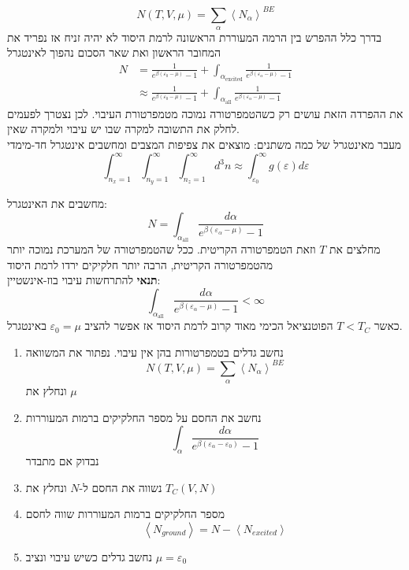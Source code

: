 \begin{cheatformula}
$$N \left( T,V,\mu \right)= \sum_\alpha \left< N_\alpha \right>^{BE}$$
בדרך כלל ההפרש בין הרמה המעוררת הראשונה לרמת היסוד לא יהיה זניח אז נפריד את המחובר הראשון ואת שאר הסכום נהפוך לאינטגרל
\begin{align*}
N &= \frac{1}{e^{\beta \left( \varepsilon_0 - \mu \right)} -1} + \int_{\alpha_{\text{excited}}} \frac{1}{e^{\beta \left( \varepsilon_\alpha - \mu \right)}-1} \\
&\approx \frac{1}{e^{\beta \left( \varepsilon_0 - \mu \right)} -1} + \int_{\alpha_{\text{all}}} \frac{1}{e^{\beta \left( \varepsilon_\alpha - \mu \right)}-1}
\end{align*}
את ההפרדה הזאת עושים רק כשהטמפרטורה נמוכה מטמפרטורת העיבוי. לכן נצטרך לפעמים לחלק את התשובה למקרה שבו יש עיבוי ולמקרה שאין.
\\
מעבר מאינטגרל של כמה משתנים: מוצאים את צפיפות המצבים ומחשבים אינטגרל חד-מימדי
$$\int_{n_x=1}^\infty\int_{n_y=1}^\infty\int_{n_z=1}^\infty d^3n \approx \int_{\varepsilon_0}^\infty g\left(\varepsilon\right)d\varepsilon$$ 
\end{cheatformula}
\begin{cheatformula}
מחשבים את האינטגרל:
$$N = \int_{\alpha_{\text{all}}} \frac{d \alpha}{e^{\beta \left( \varepsilon_\alpha - \mu \right)}-1}$$
מחלצים את $T$ וזאת הטמפרטורה הקריטית. ככל שהטמפרטורה של המערכת נמוכה יותר מהטמפרטורה הקריטית, הרבה יותר 
חלקיקים ירדו לרמת היסוד
\\
\textbf{תנאי} להתרחשות עיבוי בוז-אינשטיין:
$$\int_{\alpha_{\text{all}}} \frac{d\alpha}{e^{\beta \left( \varepsilon_\alpha - \mu \right)}-1} < \infty$$
כאשר $T<T_C$ הפוטנציאל הכימי מאוד קרוב לרמת היסוד אז אפשר להציב $\varepsilon_0 = \mu$ באינטגרל.
\end{cheatformula}

\begin{cheatformula}
\begin{enumerate}
    \item נחשב גדלים בטמפרטורות בהן אין עיבוי. נפתור את המשוואה
    $$N \left( T,V,\mu \right)= \sum_\alpha \left< N_\alpha \right>^{BE}$$
    ונחלץ את $\mu$
    \item נחשב את החסם על מספר החלקיקים ברמות המעוררות 
    $$\int_\alpha \frac{d\alpha}{e^{\beta \left(\varepsilon_\alpha - \varepsilon_0 \right) } - 1}$$ 
    נבדוק אם מתבדר
    \item נשווה את החסם ל-$N$ ונחלץ את $T_C\left(V,N\right)$
    \item מספר החלקיקים ברמות המעוררות שווה לחסם
    $$\left< N_{ground} \right> = N - \left< N_{excited} \right>$$
    \item נחשב גדלים כשיש עיבוי ונציב $\mu = \varepsilon_0$
\end{enumerate}
\end{cheatformula}
